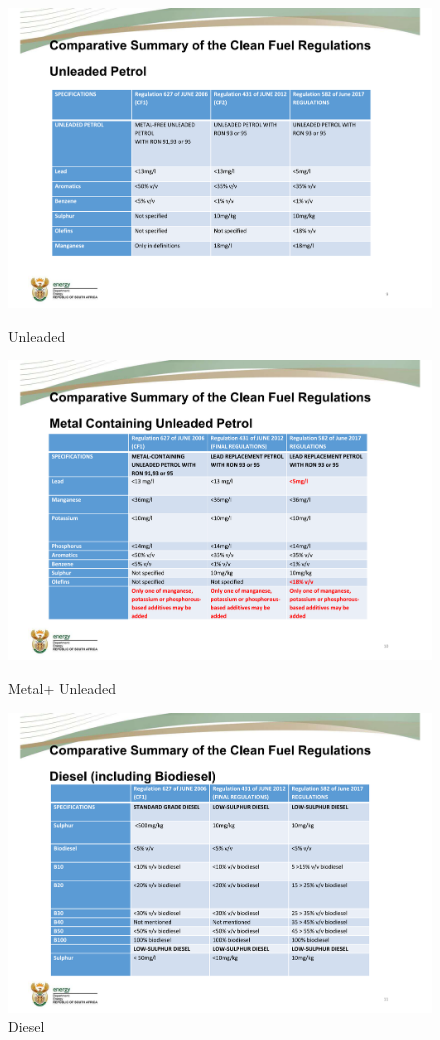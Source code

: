 \begin{figure}[!htb]
	\includegraphics[width=\linewidth]{introduction/fig/page1Comp.pdf}
	\caption{Unleaded}\label{fig:fig1}
	\endminipage\hfill
	\includegraphics[width=\linewidth]{introduction/fig/page2Comp.pdf}
	\caption{Metal+ Unleaded}\label{fig:fig2}
	\endminipage\hfill
	\includegraphics[width=\linewidth]{introduction/fig/page3Comp.pdf}
	\caption{Diesel}\label{fig:fig3}
	\endminipage
	
	
\end{figure}


